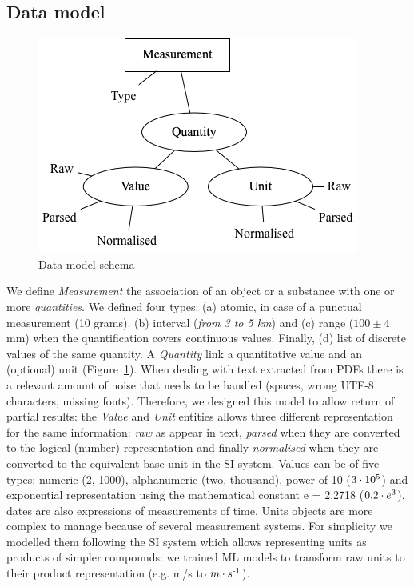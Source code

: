 \documentclass[sigconf]{acmart}
\begin{document}
\subsection{Data model}
\label{subsub:data-model}
\begin{figure}[ht]
  \centering
  \includegraphics[width=\linewidth]{images/schema-2}
  \caption{Data model schema}
  \label{fig:data-model-schema-2}
\end{figure}
We define \textit{Measurement} the association of an object or a substance with one or more \textit{quantities}. We defined four types: (a) atomic, in case of a punctual measurement (10 grams). (b) interval (\textit{from 3 to 5 km}) and (c) range ($100 \pm 4$ mm) when the quantification covers continuous values. Finally, (d) list of discrete values of the same quantity. A \textit{Quantity} link a  quantitative value and an (optional) unit (Figure~\ref{fig:data-model-schema-2}). 
When dealing with text extracted from PDFs there is a relevant amount of noise that needs to be handled (spaces, wrong UTF-8 characters, missing fonts). Therefore, we designed this model to allow return of partial results: the \textit{Value} and \textit{Unit} entities allows three different representation for the same information: \textit{raw} as appear in text, \textit{parsed} when they are converted to the logical (number) representation and finally \textit{normalised} when they are converted to the equivalent base unit in the SI system. Values can be of five types: numeric (2, 1000), alphanumeric (two, thousand), power of 10 ($3\cdot10\textsuperscript{5}$) and exponential representation using the mathematical constant e = 2.2718 ($0.2\cdot e\textsuperscript{3}$), dates are also expressions of measurements of time. Units objects are more complex to manage because of several measurement systems. For simplicity we modelled them following the SI system which allows representing units as products of simpler compounds: we trained ML models to transform raw units to their product representation (e.g. m/s to $m \cdot s\textsuperscript{-1}$).
\end{document}
